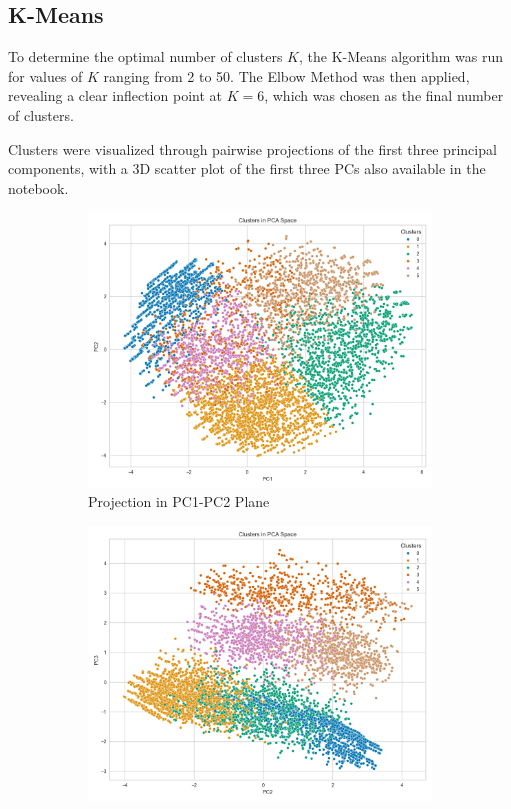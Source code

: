 \documentclass[a4paper,11pt]{article}
\begin{document}
\subsection{K-Means}
To determine the optimal number of clusters $K$, the K-Means algorithm was run for values of $K$ ranging from 2 to 50. The Elbow Method was then applied, revealing a clear inflection point at $K = 6$, which was chosen as the final number of clusters.

Clusters were visualized through pairwise projections of the first three principal components, with a 3D scatter plot of the first three PCs also available in the notebook.

\begin{figure}[h]
\centering
\begin{subfigure}{0.32\linewidth}
    \includegraphics[width=\textwidth]{figures/clustering/6-means_pca_12.png}
    \caption{Projection in PC1-PC2 Plane}
    \label{fig:cluster_12}
\end{subfigure}
\hfill
\begin{subfigure}{0.32\linewidth}
    \includegraphics[width=\textwidth]{figures/clustering/6-means_pca_23.png}

\end{subfigure}
\end{figure}
\end{document}

